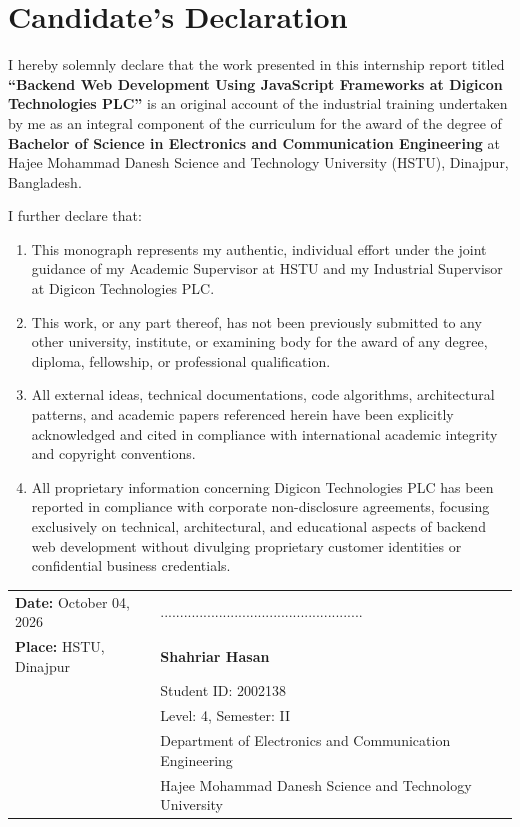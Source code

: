 \chapter*{Candidate's Declaration}

\vspace{0.6cm}
\noindent
I hereby solemnly declare that the work presented in this internship report titled \textbf{“Backend Web Development Using JavaScript Frameworks at Digicon Technologies PLC”} is an original account of the industrial training undertaken by me as an integral component of the curriculum for the award of the degree of \textbf{Bachelor of Science in Electronics and Communication Engineering} at Hajee Mohammad Danesh Science and Technology University (HSTU), Dinajpur, Bangladesh.

\vspace{0.3cm}
\noindent
I further declare that:
\begin{enumerate}
    \item This monograph represents my authentic, individual effort under the joint guidance of my Academic Supervisor at HSTU and my Industrial Supervisor at Digicon Technologies PLC.
    \item This work, or any part thereof, has not been previously submitted to any other university, institute, or examining body for the award of any degree, diploma, fellowship, or professional qualification.
    \item All external ideas, technical documentations, code algorithms, architectural patterns, and academic papers referenced herein have been explicitly acknowledged and cited in compliance with international academic integrity and copyright conventions.
    \item All proprietary information concerning Digicon Technologies PLC has been reported in compliance with corporate non-disclosure agreements, focusing exclusively on technical, architectural, and educational aspects of backend web development without divulging proprietary customer identities or confidential business credentials.
\end{enumerate}

\vspace{2.2cm}
\noindent
\begin{tabularx}{\textwidth}{lX}
\textbf{Date:} October 04, 2026 & .................................................... \\
\textbf{Place:} HSTU, Dinajpur & \textbf{Shahriar Hasan} \\
& Student ID: 2002138 \\
& Level: 4, Semester: II \\
& Department of Electronics and Communication Engineering \\
& Hajee Mohammad Danesh Science and Technology University \\
\end{tabularx}
